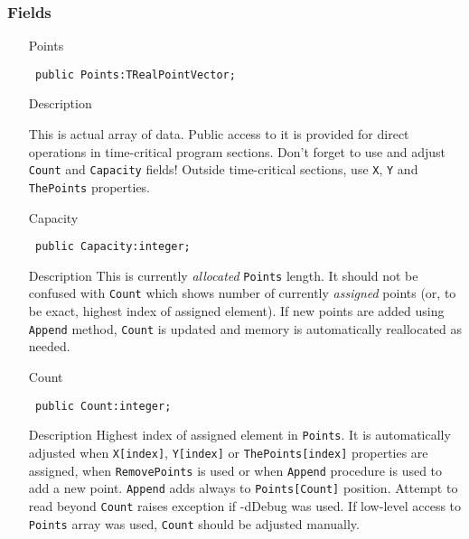 \documentclass[12pt,a4paper,oneside]{report}
\newcommand{\declarationitem}[1]{{\addfontfeatures{FakeBold=1.3} #1}}
\newcommand{\descriptiontitle}[1]{{\addfontfeatures{FakeSlant}#1}}
\newcommand{\code}[1]{\texttt{#1}}
\begin{document}
\subsubsection{Fields}
\begin{itemize}
	\label{lmPointsVec.TPoints-Points}
	\item[\declarationitem{Points}\hfill]
	\begin{flushleft}
		\code{
			public Points:TRealPointVector;}
	\end{flushleft}
\item[\descriptiontitle{Description}]

This is actual array of data. Public access to it is provided for direct operations in time-critical program sections. Don't forget to use and adjust \code{Count} and \code{Capacity} fields! Outside time-critical sections, use \code{X}, \code{Y} and \code{ThePoints} properties.
	\par  \label{lmPointsVec.TPoints-Capacity}
	\item[\declarationitem{Capacity}\hfill]
	\begin{flushleft}
		\code{
			public Capacity:integer;}
	\end{flushleft}
	\item[\descriptiontitle{Description}]	
	This is currently \emph{allocated} \code{Points} length. It should not be confused with \code{Count} which shows number of currently \emph{assigned} points (or, to be exact, highest index of assigned element). If new points are added using \code{Append} method, \code{Count} is updated and memory is automatically reallocated as needed.  
	\par  \label{lmPointsVec.TPoints-Count}
	\item[\declarationitem{Count}\hfill]
	\begin{flushleft}
		\code{
			public Count:integer;}
	\end{flushleft}
	\item[\descriptiontitle{Description}]	
	Highest index of assigned element in \code{Points}. It is automatically adjusted when \code{X[index]}, \code{Y[index]} or \code{ThePoints[index]} properties are assigned, when \code{RemovePoints} is used or when \code{Append} procedure is used to add a new point. \code{Append} adds always to \code{Points[Count]} position. Attempt to read beyond \code{Count} raises exception if -dDebug was used. If low-level access to \code{Points} array was used, \code{Count} should be adjusted manually.
	\par  \end{itemize}
\end{document}
